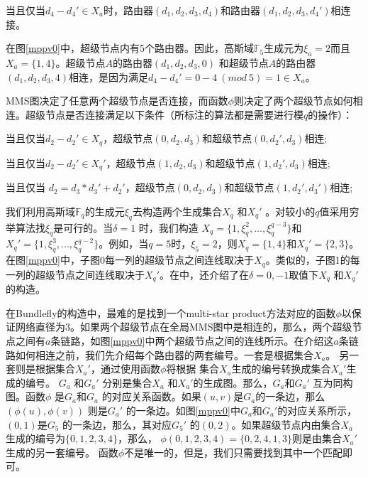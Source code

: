 当且仅当$d_{4}-d_{4}'\in X_{a}$时，路由器$(d_{1},d_{2},d_{3},d_{4})$和路由器$(d_{1},d_{2},d_{3},d_{4}')$相连接。

在图\ref{mppv0}中，超级节点内有5个路由器。因此，高斯域$\mathds{F}_{5}$生成元为$\xi_{a}=2$而且$X_{a}=\{1,4\}$。超级节点$A$的路由器$(d_{1},d_{2},d_{3},0)$ 和超级节点$A$的路由器$(d_{1},d_{2},d_{3},4)$相连，是因为满足$d_{4}-d_{4}'= 0-4\ (mod\ 5)=1 \in X_{a}$。

MMS图决定了任意两个超级节点是否连接，而函数$\phi$则决定了两个超级节点如何相连。超级节点是否连接满足以下条件（所标注的算法都是需要进行模$q$的操作）：

当且仅当$d_{2}-d_{2}'\in X_{q}$，超级节点$(0,d_{2},d_{3})$和超级节点$(0,d_{2}',d_{3})$相连;

当且仅当$d_{2}-d_{2}'\in X_{q}'$，超级节点$(1,d_{2},d_{3})$和超级节点$(1,d_{2}',d_{3})$相连;

当且仅当 $d_{2}=d_{3}*d_{3}'+d_{2}'$，超级节点$(0,d_{2},d_{3})$和超级节点$(1,d_{2}',d_{3}')$相连;

我们利用高斯域$\mathds{F}_{q}$的生成元$\xi_{q}$去构造两个生成集合$X_{q}$ 和$X_{q}'$ 。对较小的$q$值采用穷举算法找$\xi_{q}$是可行的。当$\delta=1$ 时，我们构造 $X_{q}=\{1,\xi_{q}^{2},...,\xi_{q}^{q-3}\}$和$X_{q}'=\{1,\xi_{q}^{3},...,\xi_{q}^{q-2}\}$。例如，当$q=5$时，$\xi_{5}=2$，则$X_{q}=\{1,4\}$和$X_{q}'=\{2,3\}$。在图\ref{mppv0}中，子图0每一列的超级节点之间连线取决于$X_{q}$。类似的，子图1的每一列的超级节点之间连线取决于$X_{q}'$。在中，还介绍了在$\delta=0,-1$取值下$X_{q}$ 和$X_{q}'$的构造。

在Bundlefly的构造中，最难的是找到一个multi-star product方法对应的函数$\phi$以保证网络直径为3。如果两个超级节点在全局MMS图中是相连的，那么，两个超级节点之间有$a$条链路，如图\ref{mppv0}中两个超级节点之间的连线所示。在介绍这$a$条链路如何相连之前，我们先介绍每个路由器的两套编号。一套是根据集合$X_{a}$。 另一套则是根据集合$X_{a}'$，通过使用函数$\phi$将根据
集合$X_{a}$生成的编号转换成集合$X_{a}'$生成的编号。 
$G_{a}$ 和$G_{a}'$ 分别是集合$X_{a}$ 和$X_{a}'$的生成图。那么，$G_{a}$和$G_{a}'$ 互为同构图。函数$\phi$ 是$G_{a}$和$G_{a}$ 的对应关系函数。如果$(u,v)$是$G_{a}$的一条边，那么$(\phi(u),\phi(v))$ 则是$G_{a}'$ 的一条边。如图\ref{mppv0}中$G_{a}$和$G_{a}'$的对应关系所示，$(0,1)$是$G_{5}$ 的一条边，那么，其对应$G_{5}'$ 的$(0,2)$。如果超级节点内由集合$X_{a}$生成的编号为$\{0,1,2,3,4\}$，那么， $\phi(0,1,2,3,4)=\{0,2,4,1,3\}$则是由集合$X_{a}'$生成的另一套编号。
函数$\phi$不是唯一的，但是，我们只需要找到其中一个匹配即可。

